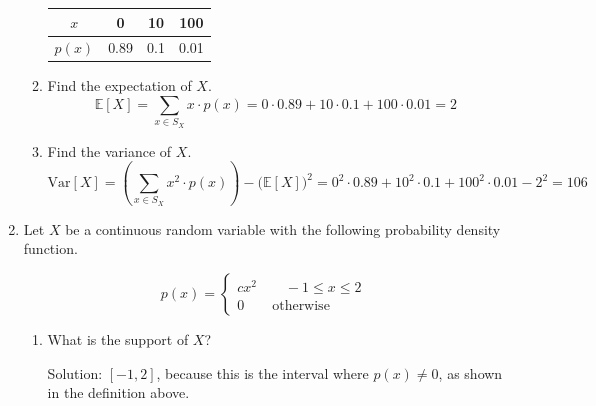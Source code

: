 \documentclass[11pt]{article}
\begin{document}
\begin{enumerate}
\begin{enumerate}
\begin{center}
        \begin{tabular}{c|ccc}
            \hline
           $x$  & 0 & 10 & 100 \\
           \hline
           $p(x)$  & 0.89 &  0.1 & 0.01\\
           \hline
        \end{tabular}
    \end{center}
    \vspace{0.5cm}

    \item Find the expectation of $X$.
    \vspace{0.5cm}
    {
    \color{blue}
        $$\mathbb{E}[X] = \sum_{x \in S_X} x\cdot p(x) = 0\cdot0.89+10\cdot 0.1+100\cdot0.01 = 2$$
    }
    \vspace{0.5cm}
    \item Find the variance of $X$.
    \vspace{0.5cm}
    {
    \color{blue}
        $$\mathrm{Var}[X] = \left(\sum_{x \in S_X} x^2\cdot p(x)\right) -\Big(\mathbb{E}[X]\Big)^2  = 0^2\cdot0.89+10^2\cdot 0.1+100^2\cdot0.01 -2^2 = 106$$
    }
    \vspace{0.5cm}



\end{enumerate}


\newpage


\item Let $X$ be a continuous random variable with the following probability density function.

\[p(x)=\begin{cases}cx^2\qquad -1\le x\le 2\\ 0 \qquad \text{otherwise}\end{cases}\]

\begin{enumerate}
    \item What is the support of $X$?

    {\color{blue}Solution: $[-1, 2]$, because this is the interval where $p(x) \neq 0$, as shown in the definition above.}


\end{enumerate}
\end{enumerate}
\end{document}
